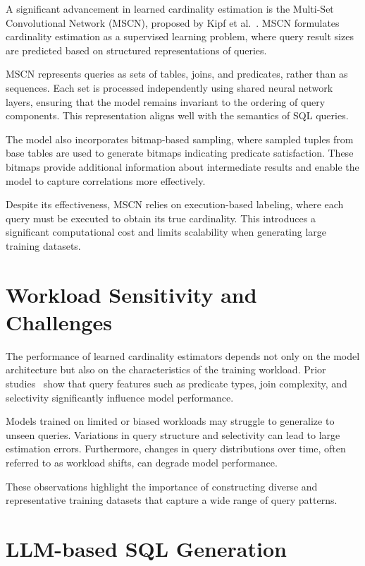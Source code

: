 A significant advancement in learned cardinality estimation is the Multi-Set Convolutional Network (MSCN), proposed by Kipf et al.~\cite{DBLP:conf/cidr/KipfKRLBK19}. MSCN formulates cardinality estimation as a supervised learning problem, where query result sizes are predicted based on structured representations of queries.

MSCN represents queries as sets of tables, joins, and predicates, rather than as sequences. Each set is processed independently using shared neural network layers, ensuring that the model remains invariant to the ordering of query components. This representation aligns well with the semantics of SQL queries.

The model also incorporates bitmap-based sampling, where sampled tuples from base tables are used to generate bitmaps indicating predicate satisfaction. These bitmaps provide additional information about intermediate results and enable the model to capture correlations more effectively.

Despite its effectiveness, MSCN relies on execution-based labeling, where each query must be executed to obtain its true cardinality. This introduces a significant computational cost and limits scalability when generating large training datasets.

\section{Workload Sensitivity and Challenges}

The performance of learned cardinality estimators depends not only on the model architecture but also on the characteristics of the training workload. Prior studies~\cite{DBLP:journals/pvldb/WangQWWZ21} show that query features such as predicate types, join complexity, and selectivity significantly influence model performance.

Models trained on limited or biased workloads may struggle to generalize to unseen queries. Variations in query structure and selectivity can lead to large estimation errors. Furthermore, changes in query distributions over time, often referred to as workload shifts, can degrade model performance.

These observations highlight the importance of constructing diverse and representative training datasets that capture a wide range of query patterns.

\section{LLM-based SQL Generation}

